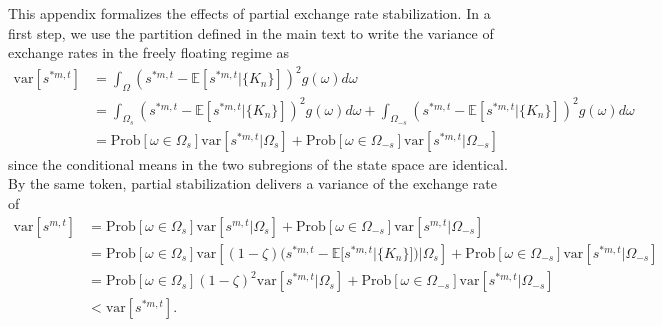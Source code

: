 This appendix formalizes the effects of partial exchange rate
stabilization. In a first step, we use the partition defined in the main text to write the
variance of exchange rates in the freely floating regime as
\begin{equation}
  \begin{split}
    \text{var}[s^{\ast m,t}] &= \int_{\Omega} \left(s^{\ast m,t}-
      \mathbb{E}[s^{\ast m,t}|\{K_n\}]\right)^2g(\omega) d\omega
    \\
    &= \int_{\Omega_s} \left(s^{\ast m,t}-\mathbb{E}[s^{\ast m,t}|\{K_n\}]\right)^2 g(\omega)d\omega+\int_{\Omega_{-s}} \left(s^{\ast m,t}-\mathbb{E}[s^{\ast m,t}|\{K_n\}]\right)^2g(\omega)d\omega\\
    &=\text{Prob}\left[\omega\in\Omega_s\right]
    \text{var}\left[s^{\ast
        m,t}|\Omega_s\right]+\text{Prob}\left[\omega\in\Omega_{-s}\right]
    \text{var}\left[s^{\ast m,t}|\Omega_{-s}\right]
  \end{split}
\end{equation}
since the conditional means in the two subregions of the state space
are identical. By the same token, partial stabilization delivers a
variance of the exchange rate of
\begin{equation}
  \begin{split}
    \text{var}[s^{m,t}]&= \text{Prob}\left[\omega\in\Omega_s\right] \text{var}\left[s^{m,t}|\Omega_s\right]+\text{Prob}\left[\omega\in\Omega_{-s}\right] \text{var}\left[s^{m,t}|\Omega_{-s}\right]\\
    &=\text{Prob}\left[\omega\in\Omega_s\right] \text{var}\left[(1-\zeta)(s^{\ast m,t}-\mathbb{E}[s^{\ast m,t}|\{K_n\}])|\Omega_s\right]+\text{Prob}\left[\omega\in\Omega_{-s}\right] \text{var}\left[s^{\ast m,t}|\Omega_{-s}\right]\\
    &=\text{Prob}\left[\omega\in\Omega_s\right] (1-\zeta)^2\text{var}\left[s^{\ast m,t}|\Omega_s\right]+\text{Prob}\left[\omega\in\Omega_{-s}\right] \text{var}\left[s^{\ast m,t}|\Omega_{-s}\right]\\
    &<\text{var}\left[s^{\ast m,t}\right].
  \end{split}
\end{equation}

